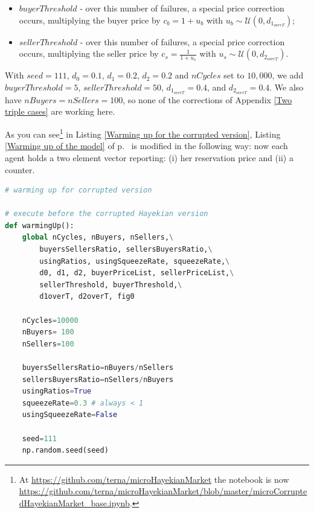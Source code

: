 \documentclass[10pt]{report}
\begin{document}
\begin{appendices}
\begin{itemize}

\item $buyerThreshold$ - over this number of failures, a special price correction occurs, multiplying the buyer price by $c_b=1 + u_b$ with $u_b\sim\mathcal{U}(0,d_{1_{overT}})$;

\item $sellerThreshold$ - over this number of failures, a special price correction occurs, multiplying the seller price by $c_s=\frac{1} {1 + u_s}$ with $u_s\sim\mathcal{U}(0,d_{2_{overT}})$.

\end{itemize}

With $seed=111$,  $d_0=0.1$, $d_1=0.2$, $d_2=0.2$ and $nCycles$ set to $10,000$, we add $buyerThreshold=5$,  $sellerThreshold=50$, $d_{1_{overT}}=0.4$, and $d_{2_{overT}}=0.4$. We also have $nBuyers=nSellers=100$, so none of the corrections of Appendix \ref{Two triple cases} are working here.

As you can see\footnote{At \url{https://github.com/terna/microHayekianMarket} the notebook is now \url{https://github.com/terna/microHayekianMarket/blob/master/microCorruptedHayekianMarket_base.ipynb}.} in Listing \ref{Warming up for the corrupted version}, Listing \ref{Warming up of the model} of p.~\pageref{Warming up of the model} is modified in the following way: now each agent holds a two element vector reporting: (i) her reservation price and (ii) a counter.


\begin{lstlisting}[language=Python, caption=Warming up for the corrupted version of the model, 
label={Warming up for the corrupted version},basicstyle=\ttfamily\footnotesize]
# warming up for corrupted version

# execute before the corrupted Hayekian version
def warmingUp():
    global nCycles, nBuyers, nSellers,\
        buyersSellersRatio, sellersBuyersRatio,\
        usingRatios, usingSqueezeRate, squeezeRate,\
        d0, d1, d2, buyerPriceList, sellerPriceList,\
        sellerThreshold, buyerThreshold,\
        d1overT, d2overT, fig0

    nCycles=10000
    nBuyers= 100
    nSellers=100

    buyersSellersRatio=nBuyers/nSellers
    sellersBuyersRatio=nSellers/nBuyers
    usingRatios=True
    squeezeRate=0.3 # always < 1 
    usingSqueezeRate=False

    seed=111
    np.random.seed(seed)


\end{lstlisting}
\end{appendices}
\end{document}
